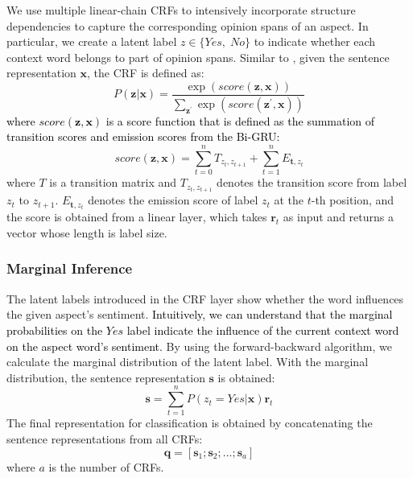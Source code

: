 \documentclass[11pt,a4paper]{article}
\begin{document}
We use multiple linear-chain CRFs to intensively incorporate structure dependencies to capture the corresponding opinion spans of an aspect. In particular, we create a latent label \cite{bailin-lu:2018:AAAI2018} $z \in \{Yes, \; No\} $ to indicate whether each context word belongs to part of opinion spans.  Similar to \cite{lample-etal-2016-neural}, given the sentence representation $\mathbf{x}$, the CRF is defined as:
\setlength{\abovedisplayskip}{6pt} \setlength{\abovedisplayshortskip}{6pt}
\setlength{\belowdisplayskip}{6pt} \setlength{\belowdisplayshortskip}{6pt}
\begin{equation}
    P(\mathbf{z} | \mathbf{x}) = \frac{\exp(score( \mathbf{z},  \mathbf{x} ))}{\sum_{\mathbf{z}^{'}} \exp(score( \mathbf{z}^{'}, \mathbf{x}))}
    \label{eq:prob}
\end{equation}
\textcolor{black}{where $score(\mathbf{z},\mathbf{x})$ is a score function that is defined as the summation of transition scores and emission scores from the Bi-GRU:}
\begin{equation}
    score(\mathbf{z}, \mathbf{x}) = \sum_{t=0}^{n} T_{z_t, z_{t+1}} + \sum_{t=1}^{n} E_{\mathbf{t}, z_t }
\end{equation}
where $T$ is a transition matrix and ${T_{z_{t}, z_{t+1}}} $ denotes the transition score from label $z_t$ to $z_{t+1}$.
$E_{\mathbf{t}, z_t }$ denotes the emission score of label $z_t$ at the $t$-th position, and the score is obtained from a linear layer, which takes  $ \mathbf{r}_t$ as input and returns a vector whose length is label size.



\subsubsection{Marginal Inference}
The latent labels introduced in the CRF layer show whether the word influences the given aspect's sentiment.  \textcolor{black}{Intuitively, we can understand that the marginal probabilities on the $Yes$ label indicate the influence of the current context word on the aspect word's sentiment. }
 By using the forward-backward algorithm, we calculate the marginal distribution of the latent label. With the marginal distribution, the sentence representation $\mathbf{s}$ is obtained:
\begin{equation}
\label{head_rep}
\mathbf{s} = \sum_{t=1}^{n} P(z_t = Yes | \mathbf{x}) \mathbf{r}_t
\end{equation}
 The final  representation for classification is obtained by concatenating the sentence representations from all CRFs:
\begin{equation}
    \mathbf{q} = [\mathbf{s}_1; \mathbf{s}_2; ...; \mathbf{s}_a]
    \label{eq:sent_rep}
\end{equation}
where $a$ is the number of CRFs.
\end{document}
